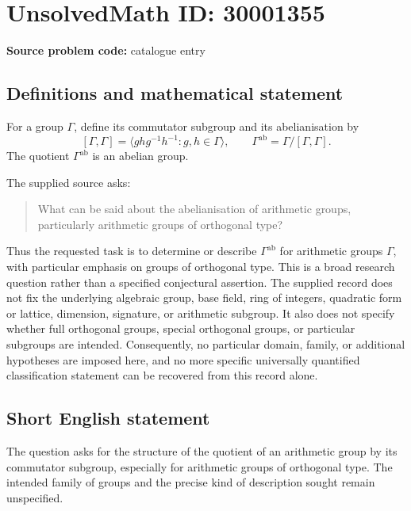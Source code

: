 \documentclass[11pt]{article}
\begin{document}
\section*{UnsolvedMath ID: 30001355}
\textbf{Source problem code:} catalogue entry
\subsection{Definitions and mathematical statement}
For a group \(\Gamma\), define its commutator subgroup and its abelianisation by
\[
[\Gamma,\Gamma]
=\bigl\langle ghg^{-1}h^{-1}:g,h\in\Gamma\bigr\rangle,
\qquad
\Gamma^{\mathrm{ab}}=\Gamma/[\Gamma,\Gamma].
\]
The quotient \(\Gamma^{\mathrm{ab}}\) is an abelian group.

The supplied source asks:
\begin{quote}
What can be said about the abelianisation of arithmetic groups, particularly arithmetic groups of orthogonal type?
\end{quote}
Thus the requested task is to determine or describe \(\Gamma^{\mathrm{ab}}\) for arithmetic groups \(\Gamma\), with particular emphasis on groups of orthogonal type. This is a broad research question rather than a specified conjectural assertion. The supplied record does not fix the underlying algebraic group, base field, ring of integers, quadratic form or lattice, dimension, signature, or arithmetic subgroup. It also does not specify whether full orthogonal groups, special orthogonal groups, or particular subgroups are intended. Consequently, no particular domain, family, or additional hypotheses are imposed here, and no more specific universally quantified classification statement can be recovered from this record alone.
\subsection{Short English statement}
The question asks for the structure of the quotient of an arithmetic group by its commutator subgroup, especially for arithmetic groups of orthogonal type. The intended family of groups and the precise kind of description sought remain unspecified.
\end{document}
